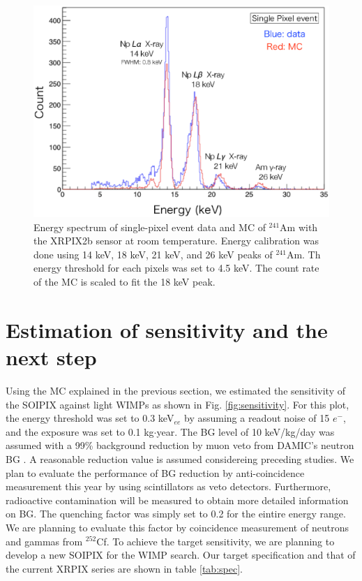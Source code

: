 \documentclass[12pt]{article}
\begin{document}
\begin{figure}[htb]
\centering
\includegraphics[height=8 cm]{spectrum.eps}
\caption{Energy spectrum of single-pixel event data and MC of $^{241}$Am with the XRPIX2b sensor at room temperature. Energy calibration was done using 14 keV, 18 keV, 21 keV, and 26 keV peaks of $^{241}$Am.  Th energy threshold for each pixels was set to 4.5 keV.  The count rate of the MC is scaled to fit the 18 keV peak.}
\label{fig:spectrum}
\end{figure}

\section{Estimation of sensitivity and the next step}

Using the MC explained in the previous section, we estimated the sensitivity of the SOIPIX against light WIMPs as shown in Fig. \ref{fig:sensitivity}. For this plot, the energy threshold was set to 0.3 keV$_{ee}$ by assuming a readout noise of 15 $e^-$, and the exposure was set to 0.1 kg$\cdot$year.  The BG level of 10 keV/kg/day was assumed with a 99\% background reduction by muon veto from DAMIC's neutron BG \cite{Barreto:2011zu} . A reasonable reduction value is assumed considereing preceding studies\cite{Bungau:2005xp}.  We plan to evaluate the performance of BG reduction by anti-coincidence measurement this year by using scintillators as veto detectors. Furthermore, radioactive contamination will be measured to obtain more detailed information on BG.  The quenching factor was simply set to 0.2 for the eintire energy range. We are planning to evaluate this factor by coincidence measurement of neutrons and gammas from $^{252}$Cf.  To achieve the target sensitivity, we are planning to develop a new SOIPIX for the WIMP search. Our target specification and that of the current XRPIX series are shown in table \ref{tab:spec}.
\end{document}
